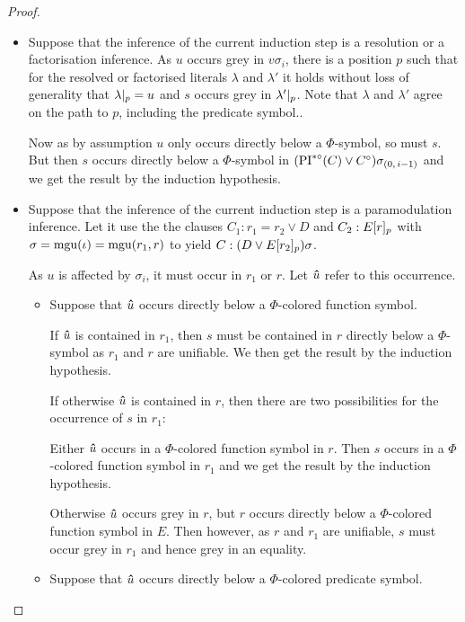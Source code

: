 \documentclass[,%
	draft=false,%
	numbers=noendperiod
	12pt,
	a4paper,
	oneside,%
	openany,
]{memoir}
\newcommand{\inv}{\ensuremath{\PIstarnosigma(C)\lor C\nosigma}}
\newcommand{\invp}{\ensuremath{(\inv)}}
\begin{document}
\begin{proof}
\begin{itemize}
\begin{itemize}
					\begin{itemize}
						\item
							Suppose that the inference of the current induction step is a resolution or a factorisation inference.
							As $u$ occurs grey in $v\sigma_i$, there is a position $p$ such that for the resolved or factorised literals $\lambda$ and $\lambda'$ it holds without loss of generality that $\lambda|_{p} = u$ and $s$ occurs grey in $\lambda'|_{p}$.
							Note that $\lambda$ and $\lambda'$ agree on the path to $p$, including the predicate symbol..

							Now as by assumption $u$ only occurs directly below a $\Phi$-symbol, so must $s$.
							But then $s$ occurs directly below a $\Phi$-symbol in $\invp\sigmazmi$ and we get the result by the induction hypothesis.

						\item
							Suppose that the inference of the current induction step is a paramodulation inference.
							Let it use the the clauses $C_1: r_1=r_2 \lor D$ and $C_2: E{[r]_{p}}$ with $\sigma=\operatorname{mgu}(\iota)=\operatorname{mgu}(r_1, r)$ to yield $C: (D\lor E{[r_2]_{p}})\sigma$.

							As $u$ is affected by $\sigma_i$, it must occur in $r_1$ or $r$. Let $\bm\hat u$ refer to this occurrence.

							\begin{itemize}
								\item
									Suppose that $\bm\hat u$ occurs directly below a $\Phi$-colored function symbol. 

									If $\bm\hat u$ is contained in $r_1$, then $s$ must be contained in $r$ directly below a $\Phi$-symbol as $r_1$ and $r$ are unifiable. We then get the result by the induction hypothesis.

									If otherwise $\bm\hat u$ is contained in $r$, 
									then there are two possibilities for the occurrence of $s$ in $r_1$:

									Either $\bm\hat u$ occurs in a $\Phi$-colored function symbol in $r$. Then $s$ occurs in a $\Phi$-colored function symbol in $r_1$ and we get the result by the induction hypothesis.

									Otherwise $\bm\hat u$ occurs grey in $r$, but $r$ occurs directly below a $\Phi$-colored function symbol in $E$.
									Then however, as $r$ and $r_1$ are unifiable, $s$ must occur grey in $r_1$ and hence grey in an equality.

								\item
									Suppose that $\bm\hat u$ occurs directly below a $\Phi$-colored predicate symbol. 


\end{itemize}
\end{itemize}
\end{itemize}
\end{itemize}
\end{proof}
\end{document}
